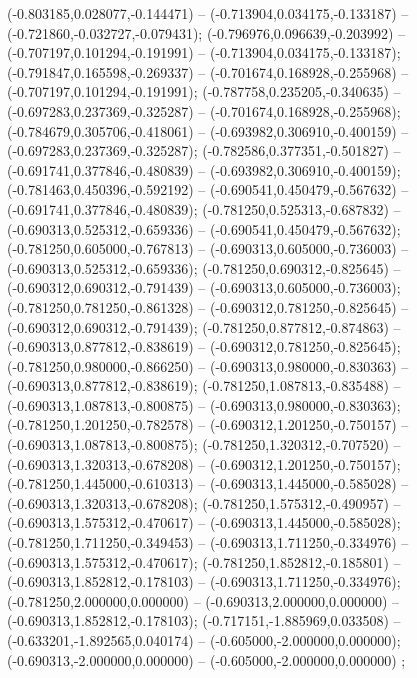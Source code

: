  (-0.803185,0.028077,-0.144471) -- (-0.713904,0.034175,-0.133187) -- (-0.721860,-0.032727,-0.079431);
 (-0.796976,0.096639,-0.203992) -- (-0.707197,0.101294,-0.191991) -- (-0.713904,0.034175,-0.133187);
 (-0.791847,0.165598,-0.269337) -- (-0.701674,0.168928,-0.255968) -- (-0.707197,0.101294,-0.191991);
 (-0.787758,0.235205,-0.340635) -- (-0.697283,0.237369,-0.325287) -- (-0.701674,0.168928,-0.255968);
 (-0.784679,0.305706,-0.418061) -- (-0.693982,0.306910,-0.400159) -- (-0.697283,0.237369,-0.325287);
 (-0.782586,0.377351,-0.501827) -- (-0.691741,0.377846,-0.480839) -- (-0.693982,0.306910,-0.400159);
 (-0.781463,0.450396,-0.592192) -- (-0.690541,0.450479,-0.567632) -- (-0.691741,0.377846,-0.480839);
 (-0.781250,0.525313,-0.687832) -- (-0.690313,0.525312,-0.659336) -- (-0.690541,0.450479,-0.567632);
 (-0.781250,0.605000,-0.767813) -- (-0.690313,0.605000,-0.736003) -- (-0.690313,0.525312,-0.659336);
 (-0.781250,0.690312,-0.825645) -- (-0.690312,0.690312,-0.791439) -- (-0.690313,0.605000,-0.736003);
 (-0.781250,0.781250,-0.861328) -- (-0.690312,0.781250,-0.825645) -- (-0.690312,0.690312,-0.791439);
 (-0.781250,0.877812,-0.874863) -- (-0.690313,0.877812,-0.838619) -- (-0.690312,0.781250,-0.825645);
 (-0.781250,0.980000,-0.866250) -- (-0.690313,0.980000,-0.830363) -- (-0.690313,0.877812,-0.838619);
 (-0.781250,1.087813,-0.835488) -- (-0.690313,1.087813,-0.800875) -- (-0.690313,0.980000,-0.830363);
 (-0.781250,1.201250,-0.782578) -- (-0.690312,1.201250,-0.750157) -- (-0.690313,1.087813,-0.800875);
 (-0.781250,1.320312,-0.707520) -- (-0.690313,1.320313,-0.678208) -- (-0.690312,1.201250,-0.750157);
 (-0.781250,1.445000,-0.610313) -- (-0.690313,1.445000,-0.585028) -- (-0.690313,1.320313,-0.678208);
 (-0.781250,1.575312,-0.490957) -- (-0.690313,1.575312,-0.470617) -- (-0.690313,1.445000,-0.585028);
 (-0.781250,1.711250,-0.349453) -- (-0.690313,1.711250,-0.334976) -- (-0.690313,1.575312,-0.470617);
 (-0.781250,1.852812,-0.185801) -- (-0.690313,1.852812,-0.178103) -- (-0.690313,1.711250,-0.334976);
 (-0.781250,2.000000,0.000000) -- (-0.690313,2.000000,0.000000) -- (-0.690313,1.852812,-0.178103);
 (-0.717151,-1.885969,0.033508) -- (-0.633201,-1.892565,0.040174) -- (-0.605000,-2.000000,0.000000);
 (-0.690313,-2.000000,0.000000) -- (-0.605000,-2.000000,0.000000) ;
